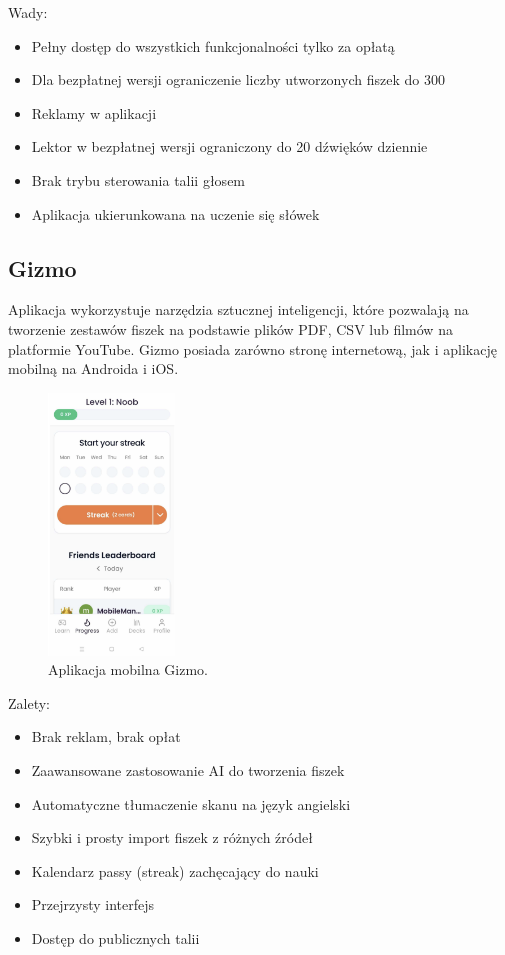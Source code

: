 Wady:
\begin{itemize}
    \item Pełny dostęp do wszystkich funkcjonalności tylko za opłatą
    \item Dla bezpłatnej wersji ograniczenie liczby utworzonych fiszek do 300
    \item Reklamy w aplikacji
    \item Lektor w bezpłatnej wersji ograniczony do 20 dźwięków dziennie
    \item Brak trybu sterowania talii głosem
    \item Aplikacja ukierunkowana na uczenie się słówek
\end{itemize}

\subsection{Gizmo}

Aplikacja wykorzystuje narzędzia sztucznej inteligencji, które pozwalają na tworzenie zestawów fiszek na podstawie plików PDF, CSV lub filmów na platformie YouTube. Gizmo posiada zarówno stronę internetową, jak i aplikację mobilną na Androida i iOS.

\begin{figure}[H]
    \centering
    \includegraphics[width=0.3\textwidth]{chapters/chapter_3/gizmo.png}
    \caption{Aplikacja mobilna Gizmo.}
    \label{img:gizmo}
\end{figure}

Zalety:
\begin{itemize}
    \item Brak reklam, brak opłat
    \item Zaawansowane zastosowanie AI do tworzenia fiszek
    \item Automatyczne tłumaczenie skanu na język angielski
    \item Szybki i prosty import fiszek z różnych źródeł
    \item Kalendarz passy (streak) zachęcający do nauki
    \item Przejrzysty interfejs
    \item Dostęp do publicznych talii
\end{itemize}


